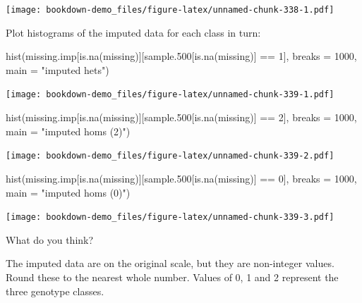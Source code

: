 \documentclass[
]{book}
\newenvironment{Shaded}{\begin{snugshade}}{\end{snugshade}}
\newcommand{\AttributeTok}[1]{\textcolor[rgb]{0.77,0.63,0.00}{#1}}
\newcommand{\DecValTok}[1]{\textcolor[rgb]{0.00,0.00,0.81}{#1}}
\newcommand{\FloatTok}[1]{\textcolor[rgb]{0.00,0.00,0.81}{#1}}
\newcommand{\FunctionTok}[1]{\textcolor[rgb]{0.00,0.00,0.00}{#1}}
\newcommand{\NormalTok}[1]{#1}
\newcommand{\SpecialCharTok}[1]{\textcolor[rgb]{0.00,0.00,0.00}{#1}}
\newcommand{\StringTok}[1]{\textcolor[rgb]{0.31,0.60,0.02}{#1}}
\begin{document}
\texttt{[image: bookdown-demo\_files/figure-latex/unnamed-chunk-338-1.pdf]}

Plot histograms of the imputed data for each class in turn:

\begin{Shaded}
\begin{Highlighting}[]
\FunctionTok{hist}\NormalTok{(missing.imp[}\FunctionTok{is.na}\NormalTok{(missing)][sample}\FloatTok{.500}\NormalTok{[}\FunctionTok{is.na}\NormalTok{(missing)] }\SpecialCharTok{==} 
    \DecValTok{1}\NormalTok{], }\AttributeTok{breaks =} \DecValTok{1000}\NormalTok{, }\AttributeTok{main =} \StringTok{"imputed hets"}\NormalTok{)}
\end{Highlighting}
\end{Shaded}

\texttt{[image: bookdown-demo\_files/figure-latex/unnamed-chunk-339-1.pdf]}

\begin{Shaded}
\begin{Highlighting}[]
\FunctionTok{hist}\NormalTok{(missing.imp[}\FunctionTok{is.na}\NormalTok{(missing)][sample}\FloatTok{.500}\NormalTok{[}\FunctionTok{is.na}\NormalTok{(missing)] }\SpecialCharTok{==} 
    \DecValTok{2}\NormalTok{], }\AttributeTok{breaks =} \DecValTok{1000}\NormalTok{, }\AttributeTok{main =} \StringTok{"imputed homs (2)"}\NormalTok{)}
\end{Highlighting}
\end{Shaded}

\texttt{[image: bookdown-demo\_files/figure-latex/unnamed-chunk-339-2.pdf]}

\begin{Shaded}
\begin{Highlighting}[]
\FunctionTok{hist}\NormalTok{(missing.imp[}\FunctionTok{is.na}\NormalTok{(missing)][sample}\FloatTok{.500}\NormalTok{[}\FunctionTok{is.na}\NormalTok{(missing)] }\SpecialCharTok{==} 
    \DecValTok{0}\NormalTok{], }\AttributeTok{breaks =} \DecValTok{1000}\NormalTok{, }\AttributeTok{main =} \StringTok{"imputed homs (0)"}\NormalTok{)}
\end{Highlighting}
\end{Shaded}

\texttt{[image: bookdown-demo\_files/figure-latex/unnamed-chunk-339-3.pdf]}

What do you think?

The imputed data are on the original scale, but they are non-integer values. Round these to the nearest whole number. Values of 0, 1 and 2 represent the three genotype classes.
\end{document}
